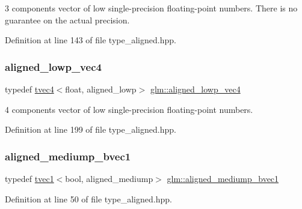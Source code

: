 3 components vector of low single-\/precision floating-\/point numbers. There is no guarantee on the actual precision. 

Definition at line 143 of file type\+\_\+aligned.\+hpp.

\mbox{\label{group__gtc__type__aligned_ga6792b3ad721290a69de969d6956c2cef}} 
\subsubsection{\texorpdfstring{aligned\_lowp\_vec4}{aligned\_lowp\_vec4}}
{\footnotesize\ttfamily typedef \mbox{\hyperlink{structglm_1_1tvec4}{tvec4}}$<$float, aligned\+\_\+lowp$>$ \mbox{\hyperlink{group__gtc__type__aligned_ga6792b3ad721290a69de969d6956c2cef}{glm\+::aligned\+\_\+lowp\+\_\+vec4}}}



4 components vector of low single-\/precision floating-\/point numbers. 



Definition at line 199 of file type\+\_\+aligned.\+hpp.

\mbox{\label{group__gtc__type__aligned_gaaafb3137651696c59dd359c891338dff}} 
\subsubsection{\texorpdfstring{aligned\_mediump\_bvec1}{aligned\_mediump\_bvec1}}
{\footnotesize\ttfamily typedef \mbox{\hyperlink{structglm_1_1tvec1}{tvec1}}$<$bool, aligned\+\_\+mediump$>$ \mbox{\hyperlink{group__gtc__type__aligned_gaaafb3137651696c59dd359c891338dff}{glm\+::aligned\+\_\+mediump\+\_\+bvec1}}}



Definition at line 50 of file type\+\_\+aligned.\+hpp.

\mbox{\label{group__gtc__type__aligned_ga6a8eda49fb7f05dc574be67d8988822b}} 
